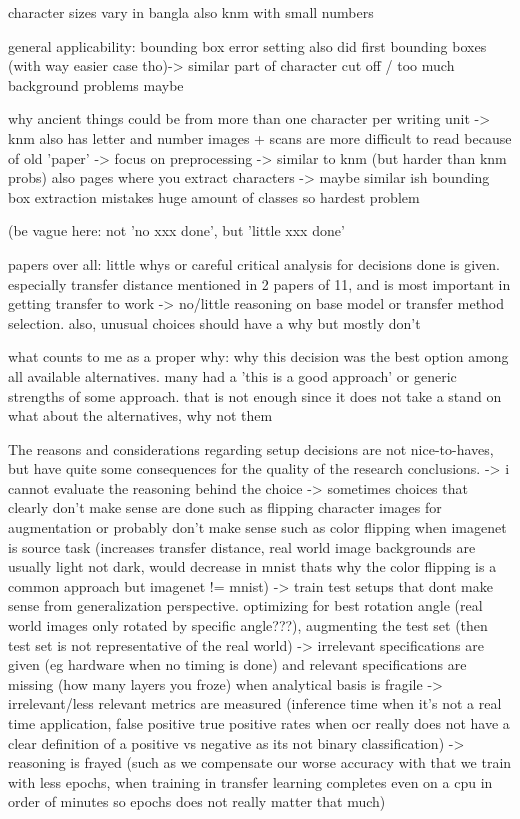 \documentclass{article}
\begin{document}
character sizes vary in bangla \cite{6shoponBangla}
also knm with small numbers

general applicability: bounding box error setting
also did first bounding boxes (with way easier case tho)-> similar part of character cut off / too much background problems maybe \cite{1akhlaghiFarsi} \cite{7rizkybasicCnnTransfer}

why ancient things could be
from \cite{9thuonPalm}
more than one character per writing unit -> knm also has letter and number
images + scans are more difficult to read because of old 'paper' -> focus on preprocessing -> similar to knm (but harder than knm probs)
also pages where you extract characters -> maybe similar ish bounding box extraction mistakes
huge amount of classes so hardest problem


(be vague here: not 'no xxx done', but 'little xxx done'

papers over all: little whys or careful critical analysis for decisions done is given. 
especially transfer distance mentioned in 2 papers of 11, and is most important in getting transfer to work -> no/little reasoning on base model or transfer method selection. also, unusual choices should have a why but mostly don't

what counts to me as a proper why: why this decision was the best option among all available alternatives. many had a 'this is a good approach' or generic strengths of some approach. that is not enough since it does not take a stand on what about the alternatives, why not them

The reasons and considerations regarding setup decisions are not nice-to-haves, but have quite some consequences for the quality of the research conclusions.
-> i cannot evaluate the reasoning behind the choice
-> sometimes choices that clearly don't make sense are done such as flipping character images for augmentation or probably don't make sense such as color flipping when imagenet is source task (increases transfer distance, real world image backgrounds are usually light not dark, would decrease in mnist thats why the color flipping is a common approach but imagenet != mnist)
-> train test setups that dont make sense from generalization perspective. optimizing for best rotation angle (real world images only rotated by specific angle???), augmenting the test set (then test set is not representative of the real world)
-> irrelevant specifications are given (eg hardware when no timing is done) and relevant specifications are missing (how many layers you froze) when analytical basis is fragile
-> irrelevant/less relevant metrics are measured (inference time when it's not a real time application, false positive true positive rates when ocr really does not have a clear definition of a positive vs negative as its not binary classification)
-> reasoning is frayed (such as we compensate our worse accuracy with that we train with less epochs, when training in transfer learning completes even on a cpu in order of minutes so epochs does not really matter that much)
\end{document}
